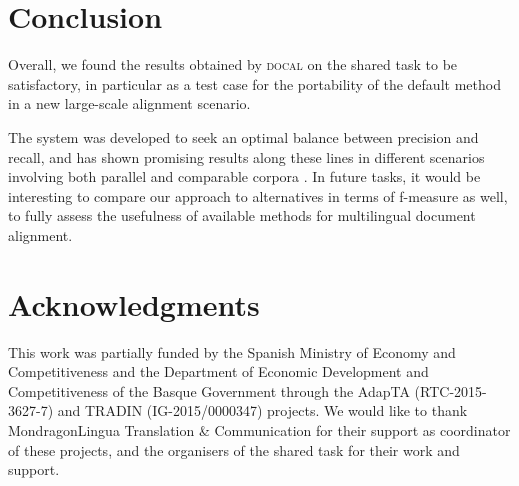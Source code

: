 \documentclass[11pt]{article}
\begin{document}
\section{Conclusion}
\label{conc}

Overall, we found the results obtained by \textsc{docal} on the shared task to be satisfactory, in particular as a test case for the portability of the default method in a new large-scale alignment scenario. 

The system was developed to seek an optimal balance between precision and recall, and has shown promising results along these lines in different scenarios involving both parallel and comparable corpora \cite{etche2016docal}. In future tasks, it would be interesting to compare our approach to alternatives in terms of f-measure as well, to fully assess the usefulness of available methods for multilingual document alignment.

\section*{Acknowledgments}

This work was partially funded by the Spanish Ministry of Economy and Competitiveness and the Department of Economic Development and Competitiveness of the Basque Government through the AdapTA (RTC-2015-3627-7) and TRADIN (IG-2015/0000347) projects. We would like to thank MondragonLingua Translation \& Communication for their support as coordinator of these projects, and the organisers of the shared task for their work and support.



\end{document}
